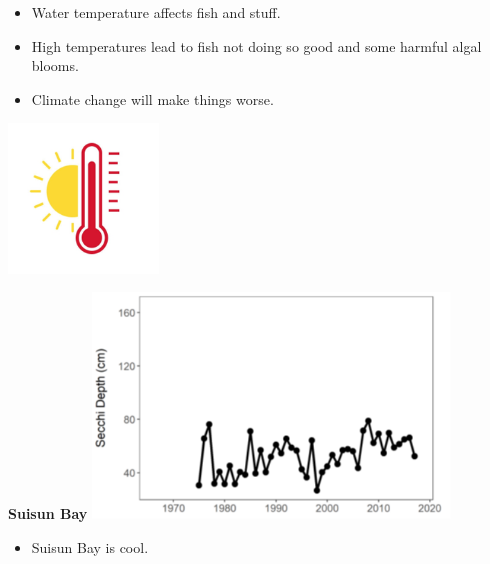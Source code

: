 \documentclass[]{article}\usepackage[]{graphicx}\usepackage[]{color}
\begin{document}
\vspace{1cm}

\begin{Row}
  \begin{Cell}{7}
    \begin{center}
      \begin{itemize}[leftmargin=1cm,rightmargin=1cm]
        \item Water temperature affects fish and stuff.
        \item High temperatures lead to fish not doing so good and some harmful 
        algal blooms.
        \item Climate change will make things worse.      
      \end{itemize}
      \vspace{0.5cm}
      \includegraphics[width=4cm,align=m]{figures/temperature/temperature_graphic.png}
    \end{center}
  \end{Cell}
  \begin{Cell}{6}
    \begin{center}
      {\bf {\large Suisun Bay}}
      \includegraphics[width=9.5cm,align=m]{figures/temperature/temp_suisun_bay_tmp.png}
      \vspace{0.5cm}
      \begin{itemize}[leftmargin=2cm,rightmargin=0.5cm]
        \item Suisun Bay is cool.
      \end{itemize}
    \end{center}
  \end{Cell}
\end{Row}
\end{document}
